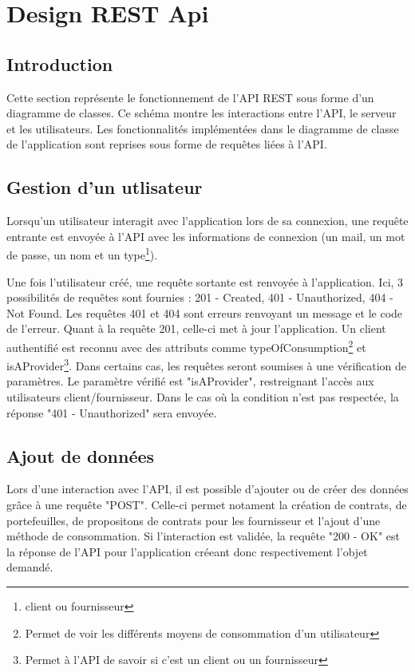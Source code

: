 \section{Design REST Api}
\subsection{Introduction}
\begin{flushleft}
Cette section représente le fonctionnement de l'API REST sous forme d'un diagramme de classes. Ce schéma montre les interactions entre l'API, le serveur et les utilisateurs. Les fonctionnalités implémentées dans le diagramme de classe de l'application sont reprises sous forme de requêtes liées à l'API.
\end{flushleft}

\subsection{Gestion d'un utlisateur}
\begin{flushleft}
Lorsqu'un utilisateur interagit avec l'application lors de sa connexion, une requête entrante est envoyée à l'API avec les informations de connexion (un mail, un mot de passe, un nom et un type\footnote{client ou fournisseur}).
\end{flushleft}

\begin{flushleft}
Une fois l'utilisateur créé, une requête sortante est renvoyée à l'application. Ici, 3 possibilités de requêtes sont fournies : 201 - Created, 401 - Unauthorized, 404 - Not Found. Les requêtes 401 et 404 sont erreurs renvoyant un message et le code de l'erreur. Quant à la requête 201, celle-ci met à jour l'application. Un client authentifié est reconnu avec des attributs comme typeOfConsumption\footnote{Permet de voir les différents moyens de consommation d'un utilisateur} et isAProvider\footnote{Permet à l'API de savoir si c'est un client ou un fournisseur}. Dans certains cas, les requêtes seront soumises à une vérification de paramètres. Le paramètre vérifié est "isAProvider", restreignant l'accès aux utilisateurs client/fournisseur. Dans le cas où la condition n'est pas respectée, la réponse "401 - Unauthorized" sera envoyée.
\end{flushleft}

\subsection{Ajout de données}
\begin{flushleft}
Lors d'une interaction avec l'API, il est possible d'ajouter ou de créer des données grâce à une requête "POST". Celle-ci permet notament la création de contrats, de portefeuilles, de propositons de contrats pour les fournisseur et l'ajout d'une méthode de consommation. Si l'interaction est validée, la requête "200 - OK" est la réponse de l'API pour l'application créeant donc respectivement l'objet demandé.
\end{flushleft}
\newpage
